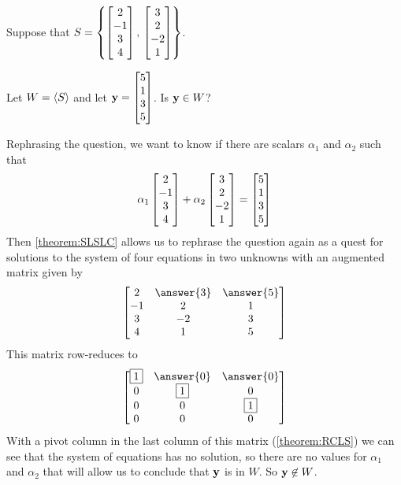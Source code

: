 \documentclass{ximera}
\author{Robert Beezer}
\begin{document}
\begin{exercise}
  Suppose that $S=\left\{\begin{bmatrix}2\\-1\\3\\4\end{bmatrix},\,\begin{bmatrix}3\\2\\-2\\1\end{bmatrix}\right\}$.

  Let $W=\left\langle S\right\rangle$ and let $\mathbf{y}=\begin{bmatrix}5\\1\\3\\5\end{bmatrix}$.  Is
  $\mathbf{y}\in W$? 

  \begin{multipleChoice}
  \end{multipleChoice}

  \begin{question}
    Rephrasing the question, we want to know if there are scalars
    $\alpha_1$ and $\alpha_2$ such that
    \[
      \alpha_1\begin{bmatrix}2\\-1\\3\\4\end{bmatrix}+\alpha_2\begin{bmatrix}3\\2\\-2\\1\end{bmatrix}=\begin{bmatrix}5\\1\\3\\5\end{bmatrix}
    \]
    Then \ref{theorem:SLSLC} allows us to rephrase the question again as a quest for solutions to the system of four equations in two unknowns with an augmented matrix given by
    \[
      \begin{bmatrix}
        2 & \answer{3} & \answer{5}\\
        -1 & 2 & 1\\
        3 & -2 & 3\\
        4 &  1 & 5
      \end{bmatrix}
    \]
    This matrix row-reduces to
    \[
      \begin{bmatrix}
        \leading{1} & \answer{0} & \answer{0}\\
        0 & \leading{1} & 0\\
        0 & 0 & \leading{1}\\
        0 & 0 & 0
      \end{bmatrix}
    \]
    With a pivot column in the last column of this matrix
    (\ref{theorem:RCLS}) we can see that the system of equations has
    no solution, so there are no values for $\alpha_1$ and $\alpha_2$
    that will allow us to conclude that $\mathbf{y}$ is in $W$.  So
    $\mathbf{y}\not\in W$.
  \end{question}
\end{exercise}
\end{document}
